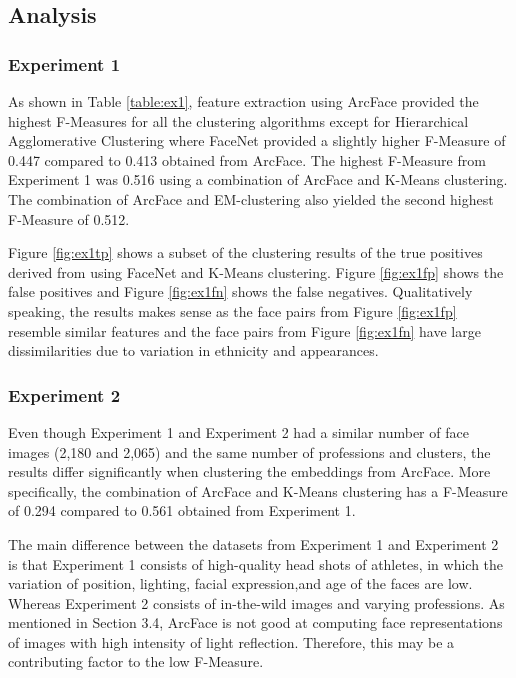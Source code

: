 \documentclass[12pt,english]{article}
\begin{document}
\subsection{Analysis}
\subsubsection{Experiment 1}
\quad
As shown in Table \ref{table:ex1}, feature extraction using ArcFace provided the highest F-Measures for all the clustering algorithms except for Hierarchical Agglomerative Clustering where FaceNet provided a slightly higher F-Measure of 0.447 compared to 0.413 obtained from ArcFace. The highest F-Measure from Experiment 1 was 0.516 using a combination of ArcFace and K-Means clustering. The combination of ArcFace and EM-clustering also yielded the second highest F-Measure of 0.512. 


Figure \ref{fig:ex1tp} shows a subset of the clustering results of the true positives derived from using FaceNet and K-Means clustering.  Figure \ref{fig:ex1fp} shows the false positives and Figure \ref{fig:ex1fn} shows the false negatives. Qualitatively speaking, the results makes sense as the face pairs from Figure \ref{fig:ex1fp} resemble similar features and the face pairs from Figure \ref{fig:ex1fn} have large dissimilarities due to variation in ethnicity and appearances.

\subsubsection{Experiment 2}
\quad
Even though Experiment 1 and Experiment 2 had a similar number of face images (2,180 and 2,065) and the same number of professions and clusters, the results differ significantly when clustering the embeddings from ArcFace. More specifically, the combination of ArcFace and K-Means clustering has a F-Measure of 0.294 compared to 0.561 obtained from Experiment 1. 

The main difference between the datasets from Experiment 1 and Experiment 2 is that Experiment 1 consists of high-quality head shots of athletes, in which the variation of position, lighting, facial expression,and age of the faces are low. Whereas Experiment 2 consists of in-the-wild images and varying professions. As mentioned in Section 3.4, ArcFace is not good at computing face representations of images with high intensity of light reflection. Therefore, this may be a contributing factor to the low F-Measure.
\end{document}

